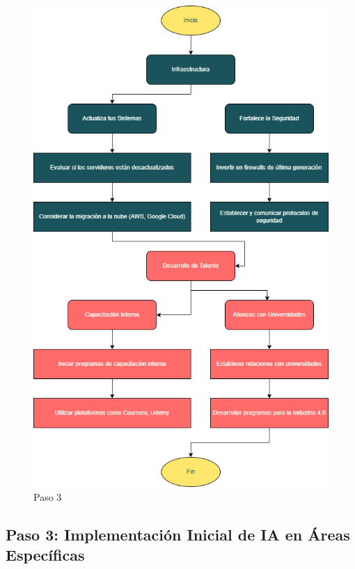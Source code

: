 \documentclass[
  10pt,
  letterpaper,
]{book}
\begin{document}
\begin{figure}[H]

{\centering \includegraphics{Img/paso3.png}

}

\caption{Paso 3}

\end{figure}%

\subsection{Paso 3: Implementación Inicial de IA en Áreas
Específicas}\label{paso-3-implementaciuxf3n-inicial-de-ia-en-uxe1reas-especuxedficas}
\end{document}
